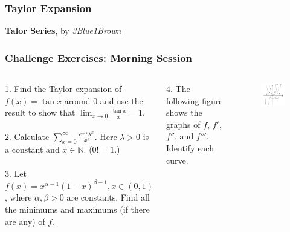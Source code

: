 \documentclass{beamer}
\begin{document}
\begin{frame}
\frametitle{Taylor Expansion}

\href{https://youtu.be/3d6DsjIBzJ4}{\textbf{Talor Series}, by \textit{3Blue1Brown}}
\end{frame}

\begin{frame}
\frametitle{Challenge Exercises: Morning Session}
\begin{columns}[t] %

1. Find the Taylor expansion of $f(x) = \tan x$ around $0$ and use the result to show that $\lim_{x \rightarrow 0} \frac{\tan x}{x} = 1$.
\\~\\
2. Calculate $\sum_{x=0}^{\infty} \frac{e^{-\lambda}\lambda^x}{x!}$. Here $\lambda > 0$ is a constant and $x \in \mathbb{N}$. ($0!=1$.)
\\~\\
3. Let $f(x) = x^{\alpha - 1}(1-x)^{\beta-1}, x\in (0,1)$, where $\alpha, \beta > 0$ are constants. Find all the minimums and maximums (if there are any) of $f$.

4. The following figure shows the graphs of $f$, $f'$, $f''$, and $f'''$. Identify each curve.
\vspace*{-0.2in}
\begin{figure}[H]
\centering
\includegraphics[width=5.5cm]{Derivative-ex-1.png}
\end{figure}

\end{columns}
\end{frame}
\end{document}
